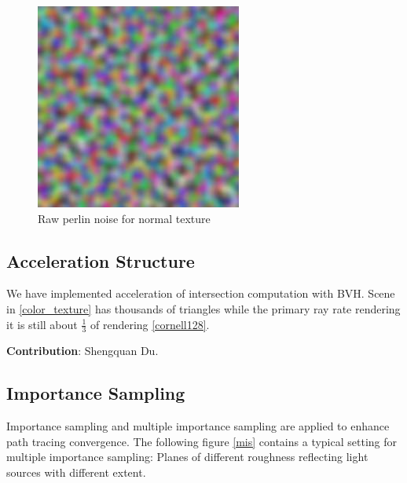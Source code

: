 \documentclass[acmtog]{acmart}
\begin{document}
\begin{figure}[h]
	\centering	
	\includegraphics[width=\linewidth]{normal_noise_256}
	\caption{Raw perlin noise for normal texture}
	\label{noise}
\end{figure}

\subsection{Acceleration Structure}

We have implemented acceleration of intersection computation with BVH. Scene in \ref{color_texture} has thousands of triangles while the primary ray rate rendering it is still about $\frac{1}{3}$ of rendering \ref{cornell128}. 

\noindent \textbf{Contribution}: Shengquan Du.

\subsection{Importance Sampling}

Importance sampling and multiple importance sampling are applied to enhance path tracing convergence. The following figure \ref{mis} contains a typical setting for multiple importance sampling: Planes of different roughness reflecting light sources with different extent.
\end{document}
